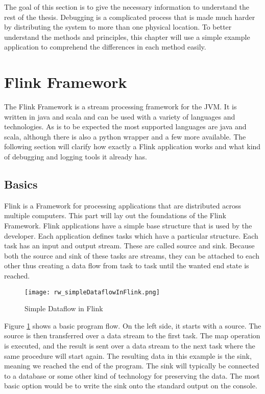 The goal of this section is to give the necessary information to understand the rest of the thesis. Debugging is a complicated process that is made much harder by distributing the system to more than one physical location. To better understand the methods and principles, this chapter will use a simple example application to comprehend the differences in each method easily.

\section{Flink Framework}
\label{flinkFramework}
The Flink Framework is a stream processing framework for the JVM. It is written in java and scala and can be used with a variety of languages and technologies. As is to be expected the most supported languages are java and scala, although there is also a python wrapper and a few more available. The following section will clarify how exactly a Flink application works and what kind of debugging and logging tools it already has.

\subsection{Basics}
Flink is a Framework for processing applications that are distributed across multiple computers. This part will lay out the foundations of the Flink Framework.
Flink applications have a simple base structure that is used by the developer. Each application defines tasks which have a particular structure. Each task has an input and output stream. These are called source and sink. Because both the source and sink of these tasks are streams, they can be attached to each other thus creating a data flow from task to task until the wanted end state is reached.

\begin{figure}[h!]
    \centering
      \texttt{[image: rw\_simpleDataflowInFlink.png]}
      \caption{Simple Dataflow in Flink \cite{ApacheFlinkSimpleDataflowFigure}}
      \label{simpleDataflowInFlink}
\end{figure}

Figure \ref{simpleDataflowInFlink} shows a basic program flow. On the left side, it starts with a source. The source is then transferred over a data stream to the first task. The map operation is executed, and the result is sent over a data stream to the next task where the same procedure will start again. The resulting data in this example is the sink, meaning we reached the end of the program. The sink will typically be connected to a database or some other kind of technology for preserving the data. The most basic option would be to write the sink onto the standard output on the console.

